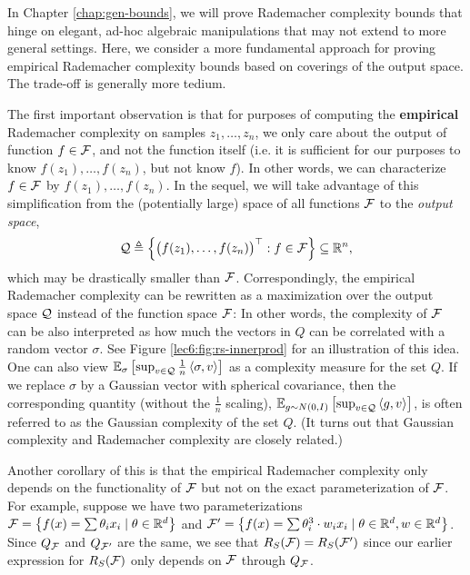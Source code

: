 
In Chapter \ref{chap:gen-bounds}, we will prove Rademacher complexity bounds that hinge on elegant, ad-hoc algebraic manipulations that may not extend to more general settings. Here, we consider a more fundamental approach for proving empirical Rademacher complexity bounds based on coverings of the output space. The trade-off is generally more tedium.

The first important observation is that for purposes of computing the \textbf{empirical} Rademacher complexity on samples $z_1, \dots, z_n$, 
we only care about the output of function $f \in \mathcal F$, and not the function itself (i.e. it is sufficient for our purposes to know $f(z_1),\dots, f(z_n)$, but not know $f$). In other words, we can characterize $f \in \mathcal F$ by $f(z_1),\dots, f(z_n)$. In the sequel, we will take advantage of this simplification from the (potentially large) space of all functions $\mathcal F$ to the \textit{output space},
\begin{equation}
\mathcal Q \triangleq \left\{ \begin{pmatrix} f(z_1), \dots, f(z_n) \end{pmatrix}^\top: f\in \mathcal F\right\} \subseteq \mathbb R^n, \label{lec6:eqn:shattercoef}
\end{equation}
which may be drastically smaller than $\mathcal F$. Correspondingly, the empirical Rademacher complexity can be rewritten as a maximization over the output space $\mathcal Q$ instead of the function space $\mathcal F$: 
In other words, the complexity of $\mathcal F$ can be also interpreted as how much the vectors in $Q$ can be correlated with a random vector $\sigma.$ See Figure \ref{lec6:fig:rs-innerprod} for an illustration of this idea. One can also view $\operatorname*{\mathbb{E}}_\sigma \left[\sup_{v\in \mathcal Q} \frac 1 n \left\langle\sigma, v\right\rangle\right]$ as a complexity measure for the set $Q$. If we replace $\sigma$ by a Gaussian vector with spherical covariance, then the corresponding quantity (without the $\frac 1 n$ scaling), $\operatorname*{\mathbb{E}}_{g\sim N(0,I)} \left[\sup_{v\in \mathcal Q} \left\langle g, v\right\rangle\right]$, is often referred to as the Gaussian complexity of the set $Q$. (It turns out that Gaussian complexity and Rademacher complexity are closely related.)

Another corollary of this is that the empirical Rademacher complexity only depends on the functionality of $\mathcal F$ but not on the exact parameterization of $\mathcal F$. For example, suppose we have two parameterizations $\mathcal F = \left\{f(x)=\sum \theta_{i} x_{i} \mid \theta \in \mathbb{R}^{d}\right\}$ and $\mathcal F' = \left\{f(x)=\sum \theta_{i}^{3} \cdot w_{i} x_{i} \mid \theta \in \mathbb R^{d}, w \in \mathbb{R}^{d}\right\}$. Since $Q_\mathcal F$ and $Q_{\mathcal F'}$ are the same, we see that $R_S(\mathcal F) = R_S(\mathcal F')$ since our earlier expression for $R_S(\mathcal F)$ only depends on $\mathcal F$ through $Q_\mathcal F$. 

